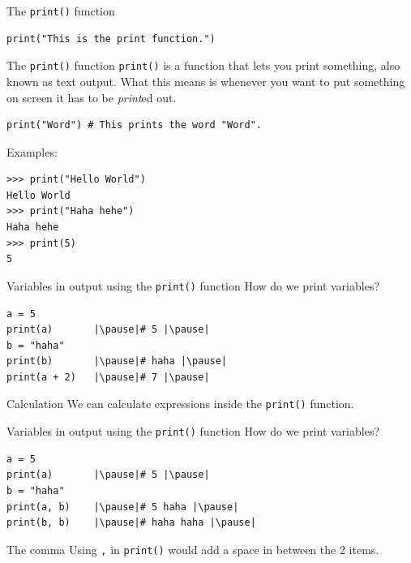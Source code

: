 \documentclass[dvipsnames, svgnames, x11names, handout]{beamer}
\begin{document}
\begin{frame}[fragile]{The \texttt{print()} function}

\begin{verbatim} 
print("This is the print function.")
\end{verbatim}
\end{frame}
    
\begin{frame}[fragile]{The \texttt{print()} function}
\texttt{print()} is a function that lets you print something, also known as text output.
What this means is whenever you want to put something on screen it has to be \textit{print}ed out.
\begin{verbatim}
print("Word") # This prints the word "Word".
\end{verbatim}
\vspace{1em}
Examples:
\begin{verbatim} 
>>> print("Hello World")
Hello World
>>> print("Haha hehe")
Haha hehe
>>> print(5)
5
\end{verbatim}
\end{frame}



\begin{frame}[fragile]{Variables in output using the \texttt{print()} function}
How do we print variables?

\begin{verbatim}
a = 5
print(a)       |\pause|# 5 |\pause|
b = "haha"
print(b)       |\pause|# haha |\pause|
print(a + 2)   |\pause|# 7 |\pause|
\end{verbatim}
\begin{block}{Calculation}
We can calculate expressions inside the \texttt{print()} function.
\end{block}
\end{frame}

\begin{frame}[fragile]{Variables in output using the \texttt{print()} function}
How do we print variables?

\begin{verbatim}
a = 5
print(a)       |\pause|# 5 |\pause|
b = "haha"
print(a, b)    |\pause|# 5 haha |\pause|
print(b, b)    |\pause|# haha haha |\pause|
\end{verbatim}
\begin{block}{The comma}
Using \texttt{,} in \texttt{print()} would add a space in between the 2 items.
\end{block}
\end{frame}
\end{document}
